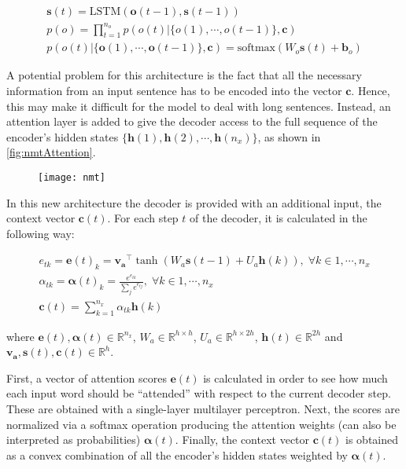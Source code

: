 \begin{equation} \label{eq:decoder}
	\begin{gathered}
		\mathbf{s}(t) = \text{LSTM}(\mathbf{o}(t-1), \mathbf{s}(t-1)) \\
		p(o) = \prod_{t=1}^{n_o} p(o(t)|\{o(1), \cdots, o(t-1)\}, \mathbf{c}) \\
		p(o(t)|\{\mathbf{o}(1), \cdots, \mathbf{o}(t-1)\}, \mathbf{c}) = \text{softmax}(W_o \mathbf{s}(t) +\textbf{b}_o)
	\end{gathered}
\end{equation}

A potential problem for this architecture is the fact that all the necessary information from an input sentence has to be encoded into the vector $\mathbf{c}$. Hence, this may make it difficult for the model to deal with long sentences. Instead, an attention layer is added to give the decoder access to the full sequence of the encoder's hidden states $\{\mathbf{h}(1), \mathbf{h}(2), \cdots, \mathbf{h}(n_x)\}$, as shown in \autoref{fig:nmtAttention}.

\begin{figure}[H]
	\centering
	\texttt{[image: nmt]}
	\label{fig:nmtAttention}
\end{figure}

In this new architecture the decoder is provided with an additional input, the context vector $\mathbf{c}(t)$. For each step $t$ of the decoder, it is calculated in the following way:

\begin{equation} \label{eq:nmtAttention}
	\begin{gathered}
		e_{tk} = \mathbf{e}(t)_k = \mathbf{v_a}^{\top} \tanh(W_a \mathbf{s}(t-1)+U_a\mathbf{h}(k)), \; \forall k \in 1, \cdots , n_x  \\
		\alpha_{tk} = \boldsymbol{\alpha}(t)_k = \frac{e^{e_{tk}}}{\sum_{j}e^{e_{tj}}}, \; \forall k \in 1, \cdots , n_x  \\
		\mathbf{c}(t) = \sum_{k=1}^{n_x} \alpha_{tk} \mathbf{h}(k)
	\end{gathered}
\end{equation}

where $\mathbf{e}(t),\boldsymbol{\alpha}(t) \in \mathbb{R}^{n_x}$, $W_a \in \mathbb{R}^{h \times h}$, $U_a \in \mathbb{R}^{h \times 2h}$, $\mathbf{h}(t) \in \mathbb{R}^{2h}$ and $\mathbf{v_a},\mathbf{s}(t),\mathbf{c}(t) \in \mathbb{R}^{h}$. 

First, a vector of attention scores $\mathbf{e}(t)$ is calculated in order to see how much each input word should be ``attended'' with respect to the current decoder step. These are obtained with a single-layer multilayer perceptron. Next, the scores are normalized via a softmax operation producing the attention weights (can also be interpreted as probabilities)  $\boldsymbol{\alpha}(t)$. Finally, the context vector $\mathbf{c}(t)$ is obtained as a convex combination of all the encoder's hidden states weighted by $\boldsymbol{\alpha}(t)$.

